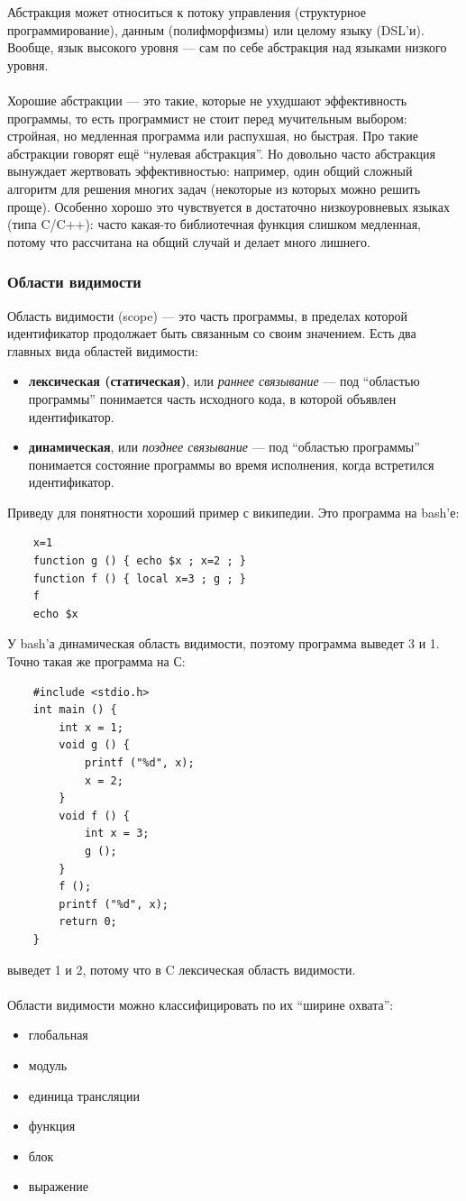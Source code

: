 \documentclass[11pt]{book}
\begin{document}
Абстракция может относиться к потоку управления (структурное программирование), данным (полифморфизмы)
или целому языку (DSL'и).
Вообще, язык высокого уровня --- сам по себе абстракция над языками низкого уровня.
\\ \\
Хорошие абстракции --- это такие, которые не ухудшают эффективность программы,
то есть программист не стоит перед мучительным выбором: стройная, но медленная программа или распухшая, но быстрая.
Про такие абстракции говорят ещё ``нулевая абстракция''.
Но довольно часто абстракция вынуждает жертвовать эффективностью:
например, один общий сложный алгоритм для решения многих задач (некоторые из которых можно решить проще).
Особенно хорошо это чувствуется в достаточно низкоуровневых языках (типа C/C++):
часто какая-то библиотечная функция слишком медленная, потому что рассчитана на общий случай и делает много лишнего.

\subsubsection{Области видимости}
Область видимости (scope) --- это часть программы, в пределах которой идентификатор продолжает быть связанным со своим значением.
Есть два главных вида областей видимости:
\begin{itemize}
\item \textbf{лексическая (статическая)}, или \emph{раннее связывание} ---
    под ``областью программы'' понимается часть исходного кода, в которой объявлен идентификатор.
\item \textbf{динамическая}, или \emph{позднее связывание} ---
    под ``областью программы'' понимается состояние программы во время исполнения, когда встретился идентификатор.
\end{itemize}
Приведу для понятности хороший пример с википедии. Это программа на bash'е:
\begin{verbatim}
    x=1
    function g () { echo $x ; x=2 ; }
    function f () { local x=3 ; g ; }
    f
    echo $x
\end{verbatim}
У bash'а динамическая область видимости, поэтому программа выведет 3 и 1.
Точно такая же программа на С:
\begin{verbatim}
    #include <stdio.h>
    int main () {
        int x = 1;
        void g () {
            printf ("%d", x);
            x = 2;
        }
        void f () {
            int x = 3;
            g ();
        }
        f ();
        printf ("%d", x);
        return 0;
    }
\end{verbatim}
выведет 1 и 2, потому что в C лексическая область видимости.
\\ \\
Области видимости можно классифицировать по их ``ширине охвата'':
\begin{itemize}
\item глобальная
\item модуль
\item единица трансляции
\item функция
\item блок
\item выражение
\end{itemize}
\end{document}
